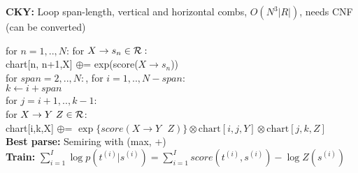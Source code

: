 \textbf{CKY:} Loop span-length, vertical and horizontal combs, $O(N^3|R|)$, needs CNF (can be converted)\\
\begin{comment}
	If a grammar is CNF, the dynamic program is computing the normalizer of the parser Z.
	Since it is a dynamic program, we can also semi-ringify it, computing the best parse or others.
	The runtime of the algorithm is $O(N^3 |R|)$.\\
\end{comment} 

for $n=1,..,N$: for $X \rightarrow s_n \in \mathcal{R}:$\\
chart[n, n+1,X] $\oplus$= exp(score($X\rightarrow s_n$))\\
for $span = 2,..,N:$, for $i = 1,..,N-span:$\\
$k \leftarrow i + span$\\
for $j = i+1,.., k-1:$\\
for $X \rightarrow Y \text{ } Z \in \mathcal{R}$:\\
chart[i,k,X] $\oplus$= $\exp \{ score(X \rightarrow Y \text{ } Z) \} \otimes \text{chart}[i,j,Y] \otimes \text{chart}[j,k,Z]$\\

\textbf{Best parse:} Semiring with (max, +)\\

\textbf{Train:} $\sum_{i=1}^I \log p(t^{(i)} | s^{(i)}) = \sum_{i=1}^I score(t^{(i)}, s^{(i)}) - \log Z(s^{(i)})$\\
\begin{comment}
	To optimize the scores, we can run backpropagation on the log-likelihood as seen before.
\end{comment}


















